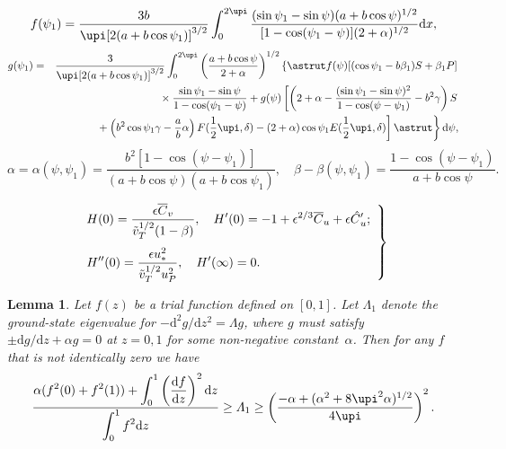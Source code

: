 \documentclass{jpp}
\newtheorem{lemma}{Lemma}
\begin{document}
{{\begin{eqnarray}
f(\psi_1) = \frac{3b}{\upi[2(a+b \cos \psi_1)]^{{3}/{2}}}
  \int^{2\upi}_0 \frac{(\sin \psi_1 - \sin \psi)(a+b \cos \psi)^{1/2}}%
  {[1 - \cos (\psi_1 - \psi)](2+\alpha)^{1/2}}\mathrm{d}x,
\label{eq42}
\end{eqnarray}
\begin{eqnarray}
g(\psi_1) & = & \frac{3}{\upi[2(a+b \cos \psi_1)]^{{3}/{2}}}
  \int^{2\upi}_0 \left(\frac{a+b \cos \psi}{2+\alpha}\right)^{1/2}
  \left\{ \astrut f(\psi)[(\cos \psi_1 - b \beta_1)S + \beta_1P]
  \right. \nonumber\\
&& \mbox{}\times \frac{\sin \psi_1 - \sin \psi}{1-\cos(\psi_1 - \psi)}
  + g(\psi) \left[\left(2+\alpha - \frac{(\sin \psi_1 - \sin \psi)^2}
  {1- \cos (\psi - \psi_1)} - b^2 \gamma \right) S \right.\nonumber\\
&& \left.\left.\mbox{} + \left( b^2 \cos \psi_1\gamma -
  \frac{a}{b}\alpha \right) F(\frac{1}{2}\upi, \delta) - (2+\alpha)
  \cos\psi_1 E(\frac{1}{2}\upi, \delta)\right] \astrut\right\} \mathrm{d} \psi,
\label{eq43}
\end{eqnarray}
\begin{equation}
\alpha = \alpha(\psi,\psi_1) = \frac{b^2[1-\cos(\psi-\psi_1)]}%
  {(a+b\cos\psi) (a+b\cos\psi_1)},
  \quad
  \beta - \beta(\psi,\psi_1) = \frac{1-\cos(\psi-\psi_1)}{a+b\cos\psi}.
\end{equation}


\begin{equation}
\left. \begin{array}{l}
\displaystyle
H(0) = \frac{\epsilon \overline{C}_v}{\tilde{v}^{{1}/{2}}_T
(1- \beta)},\quad H'(0) = -1+\epsilon^{{2}/{3}} \overline{C}_u
+ \epsilon \skew5\hat{C}_u'; \\[16pt]
\displaystyle
H''(0) = \frac{\epsilon u^2_{\ast}}{\tilde{v}^{{1}/{2}}
_T u^2_P},\quad H' (\infty) = 0.
\end{array} \right\}
\end{equation}




\begin{lemma}

Let $f(z)$ be a trial \citet[][pp.~231--232]{Batchelor59} function defined on $[0,1]$.  Let $\varLambda_1$ denote
the ground-state eigenvalue for $-\mathrm{d}^2g/\mathrm{d} z^2=\varLambda g$,
where $g$ must satisfy $\pm\mathrm{d} g/\mathrm{d} z+\alpha g=0$ at $z=0,1$
for some non-negative constant~$\alpha$.  Then for any $f$ that is not
identically zero we have
\begin{equation}
\frac{\displaystyle
  \alpha(f^2(0)+f^2(1)) + \int_0^1 \left(
  \frac{\mathrm{d} f}{\mathrm{d} z} \right)^2 \mathrm{d} z}%
  {\displaystyle \int_0^1 f^2\mathrm{d} z}
\ge \varLambda_1 \ge
\left( \frac{-\alpha+(\alpha^2+8\upi^2\alpha)^{1/2}}{4\upi} \right)^2.
\end{equation}
\end{lemma}



}}
\end{document}
